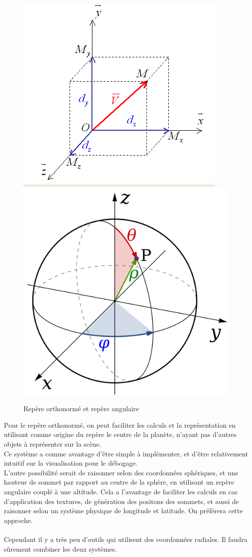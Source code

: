 \documentclass[a4paper]{article}
\begin{document}
            \begin{figure}[!h]
            \begin{center}
            \includegraphics[width=0.4\linewidth]{img/rep_ortho.png}
            \includegraphics[width=0.3\linewidth]{img/rep_sphere.png}
            \caption{Repère orthonormé \protect\footnotemark et repère angulaire \protect\footnotemark}
            \label{reperes}
            \end{center}
            \end{figure}

            
            Pour le repère orthonormé, on peut faciliter les calculs et la représentation en utilisant comme origine du repère le centre de la planète, n'ayant pas d'autres objets à représenter sur la scène.\\
            Ce système a comme avantage d'être simple à implémenter, et d'être relativement intuitif sur la visualisation pour le débogage.\\
            L'autre possibilité serait de raisonner selon des coordonnées sphériques, et une hauteur de sommet par rapport au centre de la sphère, en utilisant un repère angulaire couplé à une altitude. Cela a l'avantage de faciliter les calculs en cas d'application des textures, de génération des positons des sommets, et aussi de raisonner selon un système physique de longitude et latitude. On préférera cette approche. \\
            \\
             Cependant il y a très peu d'outils qui utilisent des coordonnées radiales. Il faudra sûrement combiner les deux systèmes.\\
            
\end{document}
